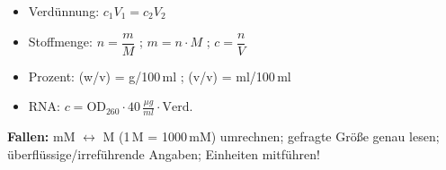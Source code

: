    \begin{itemize}
        \item Verdünnung: $c_1 V_1 = c_2 V_2$
        \item Stoffmenge: $n = \dfrac{m}{M}$ \; ; \; $m = n\cdot M$ \; ; \; $c = \dfrac{n}{V}$
        \item Prozent: (w/v) = g/100\,ml \; ; \; (v/v) = ml/100\,ml
        \item RNA: $c = \text{OD}_{260}\cdot 40\,\tfrac{\mu g}{ml}\cdot \text{Verd.}$
    \end{itemize}
    \textbf{Fallen:} mM $\leftrightarrow$ M (1\,M = 1000\,mM) umrechnen; gefragte Größe genau lesen; überflüssige/irreführende Angaben; Einheiten mitführen!



